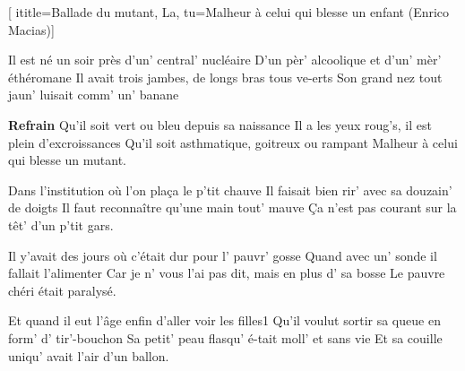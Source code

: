 [
  ititle={Ballade du mutant, La},
  tu={Malheur à celui qui blesse un enfant (Enrico Macias)}]

  
\beginverse
Il est né un soir près d'un' central' nucléaire
D'un pèr' alcoolique et d'un' mèr' éthéromane
Il avait trois jambes, de longs bras tous ve-erts
Son grand nez tout jaun' luisait comm' un' banane
\endverse

\beginchorus
\textbf{Refrain}
Qu'il soit vert ou bleu depuis sa naissance
Il a les yeux roug's, il est plein d'excroissances
Qu'il soit asthmatique, goitreux ou rampant
Malheur à celui qui blesse un mutant.
\endchorus

\beginverse
Dans l'institution où l'on plaça le p'tit chauve
Il faisait bien rir' avec sa douzain' de doigts
Il faut reconnaître qu'une main tout' mauve
Ça n'est pas courant sur la têt' d'un p'tit gars.
\endverse

\beginverse
Il y'avait des jours où c'était dur pour l' pauvr' gosse
Quand avec un' sonde il fallait l'alimenter
Car je n' vous l'ai pas dit, mais en plus d' sa bosse
Le pauvre chéri était paralysé.
\endverse

\beginverse
Et quand il eut l'âge enfin d'aller voir les filles1
Qu'il voulut sortir sa queue en form' d' tir'-bouchon
Sa petit' peau flasqu' é-tait moll' et sans vie
Et sa couille uniqu' avait l'air d'un ballon.
\endverse

\endsong
